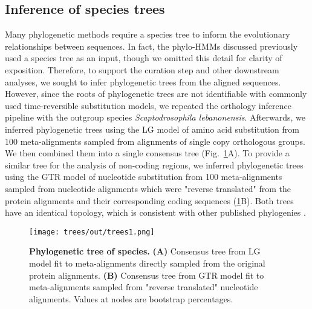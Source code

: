 \documentclass[10pt,letterpaper]{article}
\begin{document}
\subsection*{Inference of species trees}
Many phylogenetic methods require a species tree to inform the evolutionary relationships between sequences. In fact, the phylo-HMMs discussed previously used a species tree as an input, though we omitted this detail for clarity of exposition. Therefore, to support the curation step and other downstream analyses, we sought to infer phylogenetic trees from the aligned sequences. However, since the roots of phylogenetic trees are not identifiable with commonly used time-reversible substitution models, we repeated the orthology inference pipeline with the outgroup species \textit{Scaptodrosophila lebanonensis}. Afterwards, we inferred phylogenetic trees using the LG model of amino acid substitution from 100 meta-alignments sampled from alignments of single copy orthologous groups. We then combined them into a single consensus tree (Fig.~\ref{fig:trees}A). To provide a similar tree for the analysis of non-coding regions, we inferred phylogenetic trees using the GTR model of nucleotide substitution from 100 meta-alignments sampled from nucleotide alignments which were "reverse translated" from the protein alignments and their corresponding coding sequences (\ref{fig:trees}B). Both trees have an identical topology, which is consistent with other published phylogenies \cite{D12GC2007, DaLage2007}.

\begin{figure}[h!]
\texttt{[image: trees/out/trees1.png]}
\centering
\caption{\textbf{Phylogenetic tree of species.}
\textbf{(A)} Consensus tree from LG model fit to meta-alignments directly sampled from the original protein alignments. \textbf{(B)} Consensus tree from GTR model fit to meta-alignments sampled from "reverse translated" nucleotide alignments. Values at nodes are bootstrap percentages.}
\label{fig:trees}
\end{figure}
\end{document}
